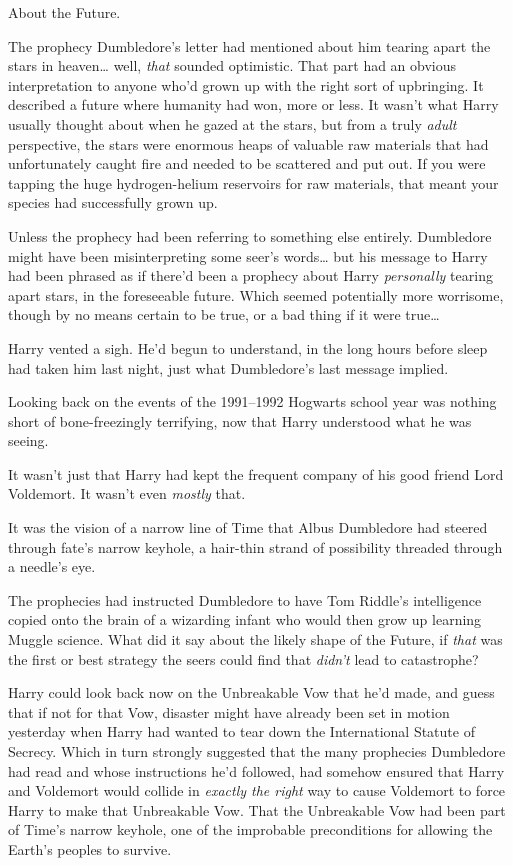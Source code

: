 About the Future.

The prophecy Dumbledore's letter had mentioned about him tearing apart the stars in heaven{\ldots} well, \emph{that} sounded optimistic. That part had an obvious interpretation to anyone who'd grown up with the right sort of upbringing. It described a future where humanity had won, more or less. It wasn't what Harry usually thought about when he gazed at the stars, but from a truly \emph{adult} perspective, the stars were enormous heaps of valuable raw materials that had unfortunately caught fire and needed to be scattered and put out. If you were tapping the huge hydrogen-helium reservoirs for raw materials, that meant your species had successfully grown up.

Unless the prophecy had been referring to something else entirely. Dumbledore might have been misinterpreting some seer's words{\ldots} but his message to Harry had been phrased as if there'd been a prophecy about Harry \emph{personally} tearing apart stars, in the foreseeable future. Which seemed potentially more worrisome, though by no means certain to be true, or a bad thing if it were true{\ldots}

Harry vented a sigh. He'd begun to understand, in the long hours before sleep had taken him last night, just what Dumbledore's last message implied.

Looking back on the events of the 1991--1992 Hogwarts school year was nothing short of bone-freezingly terrifying, now that Harry understood what he was seeing.

It wasn't just that Harry had kept the frequent company of his good friend Lord Voldemort. It wasn't even \emph{mostly} that.

It was the vision of a narrow line of Time that Albus Dumbledore had steered through fate's narrow keyhole, a hair-thin strand of possibility threaded through a needle's eye.

The prophecies had instructed Dumbledore to have Tom Riddle's intelligence copied onto the brain of a wizarding infant who would then grow up learning Muggle science. What did it say about the likely shape of the Future, if \emph{that} was the first or best strategy the seers could find that \emph{didn't} lead to catastrophe?

Harry could look back now on the Unbreakable Vow that he'd made, and guess that if not for that Vow, disaster might have already been set in motion yesterday when Harry had wanted to tear down the International Statute of Secrecy. Which in turn strongly suggested that the many prophecies Dumbledore had read and whose instructions he'd followed, had somehow ensured that Harry and Voldemort would collide in \emph{exactly the right} way to cause Voldemort to force Harry to make that Unbreakable Vow. That the Unbreakable Vow had been part of Time's narrow keyhole, one of the improbable preconditions for allowing the Earth's peoples to survive.

